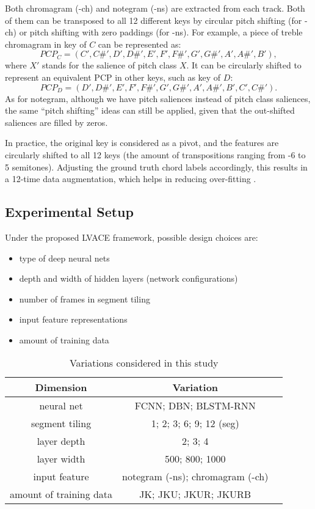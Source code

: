 Both chromagram (-ch) and notegram (-ns) are extracted from each track. Both of them can be transposed to all 12 different keys by circular pitch shifting (for -ch) or pitch shifting with zero paddings (for -ns). For example, a piece of treble chromagram in key of $C$ can be represented as:
\begin{equation}
PCP_C = (C',C\#', D', D\#', E', F', F\#', G', G\#', A', A\#', B'),
\end{equation}
where $X'$ stands for the salience of pitch class $X$. It can be circularly shifted to represent an equivalent PCP in other keys, such as key of $D$:
\begin{equation}
PCP_D = ( D', D\#', E', F', F\#', G', G\#', A', A\#', B', C',C\#').
\end{equation}
As for notegram, although we have pitch saliences instead of pitch class saliences, the same ``pitch shifting'' ideas can still be applied, given that the out-shifted saliences are filled by zeros.

In practice, the original key is considered as a pivot, and the features are circularly shifted to all 12 keys (the amount of transpositions ranging from -6 to 5 semitones). Adjusting the ground truth chord labels accordingly, this results in a 12-time data augmentation, which helps in reducing over-fitting \cite{cho2014improved,humphrey2015exploration}.

\subsection{Experimental Setup}
Under the proposed LVACE framework, possible design choices are:
\begin{itemize}
	\item type of deep neural nets
	\item depth and width of hidden layers (network configurations)
	\item number of frames in segment tiling
	\item input feature representations
	\item amount of training data
\end{itemize}

\begin{table}[h!]
	\centering
	\footnotesize
	\begin{tabular}{|c|c|c|} \hline
		Dimension & Variation \\ \hline
		neural net & FCNN; DBN; BLSTM-RNN \\ \hline
		segment tiling & 1; 2; 3; 6; 9; 12 (seg) \\ \hline
		layer depth & 2; 3; 4 \\ \hline
		layer width & 500; 800; 1000 \\ \hline
		input feature & notegram (-ns); chromagram (-ch) \\ \hline
		amount of training data & JK; JKU; JKUR; JKURB \\ \hline
	\end{tabular}
	\caption{Variations considered in this study}
	\label{tab:3-varexplore}
\end{table}

